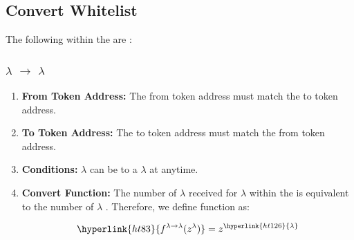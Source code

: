\documentclass[class=article, crop=false]{standalone}
\begin{document}
\subsection{Convert Whitelist} 

The following  within the  are :
\subsubsection{$\lambda$ $\rightarrow$ $\lambda$}
    \begin{enumerate}
        \item \textbf{From Token Address:} The from token address must match the to token address.
        \item \textbf{To Token Address:} The to token address must match the from token address.
        \item \textbf{Conditions:}  \hyperlink{ht126}{$\lambda$} can be  to a \hyperlink{ht126}{$\lambda$}  at anytime. 
        \item \textbf{Convert Function:} The number of \hyperlink{ht126}{$\lambda$} received for   \hyperlink{ht126}{$\lambda$} within the  is equivalent to the number of \hyperlink{ht126}{$\lambda$} . Therefore, we define function as:
        
        $$\hyperlink{ht83}{f^{\lambda \rightarrow \lambda}(z^{\lambda})} = z^{\hyperlink{ht126}{\lambda}}$$
        
    \end{enumerate}
\end{document}
